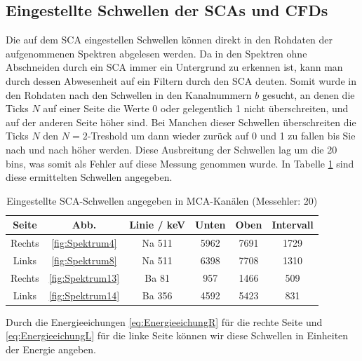 \subsection{Eingestellte Schwellen der SCAs und CFDs}

Die auf dem SCA eingestellen Schwellen können direkt in den Rohdaten der aufgenommenen Spektren abgelesen werden.
Da in den Spektren ohne Abschneiden durch ein SCA immer ein Untergrund zu erkennen ist, kann man durch dessen Abwesenheit auf ein Filtern durch den SCA deuten.
Somit wurde in den Rohdaten nach den Schwellen in den Kanalnummern $b$ gesucht, an denen die Ticks $N$ auf einer Seite die Werte 0 oder gelegentlich 1 nicht überschreiten, und auf der anderen Seite höher sind.
Bei Manchen dieser Schwellen überschreiten die Ticks $N$ den $N=2$-Treshold um dann wieder zurück auf 0 und 1 zu fallen bis Sie nach und nach höher werden.
Diese Ausbreitung der Schwellen lag um die 20 bins, was somit als Fehler auf diese Messung genommen wurde.
In Tabelle \ref{tab:SCA_Schwellen1} sind diese ermittelten Schwellen angegeben.
\begin{table}
    \centering
    \caption{Eingestellte SCA-Schwellen angegeben in MCA-Kanälen (Messehler: 20)}
    \begin{tabular}{|c|c|c|c|c|c|}
        \hline
         Seite & Abb. & Linie / \si{\kilo\eV} & Unten & Oben & Intervall \\ \hline \hline
        
         Rechts & \ref{fig:Spektrum4} & Na 511 & 5962 & 7691 & 1729 \\ \hline
         Links & \ref{fig:Spektrum8} & Na 511 & 6398 & 7708 & 1310 \\ \hline
         Rechts & \ref{fig:Spektrum13} & Ba 81 & 957 & 1466 & 509 \\ \hline
         Links & \ref{fig:Spektrum14} & Ba 356 & 4592 & 5423 & 831 \\ \hline
    \end{tabular}
    \label{tab:SCA_Schwellen1}
\end{table}
Durch die Energieeichungen \ref{eq:EnergieeichungR} für die rechte Seite und \ref{eq:EnergieeichungL} für die linke Seite können wir diese Schwellen in Einheiten der Energie angeben.

